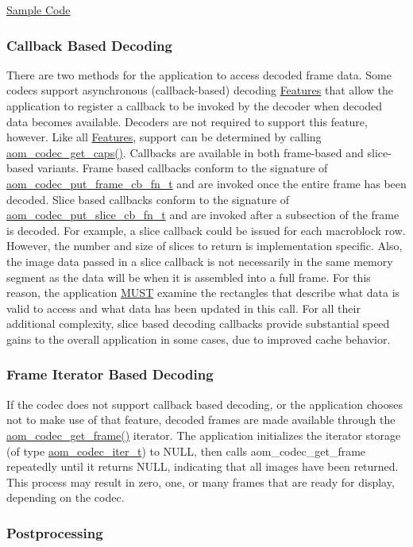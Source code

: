\hyperlink{samples}{Sample Code}\hypertarget{usage_decode_usage_cb}{}\subsubsection{Callback Based Decoding}\label{usage_decode_usage_cb}
There are two methods for the application to access decoded frame data. Some codecs support asynchronous (callback-\/based) decoding \hyperlink{usage_usage_features}{Features} that allow the application to register a callback to be invoked by the decoder when decoded data becomes available. Decoders are not required to support this feature, however. Like all \hyperlink{usage_usage_features}{Features}, support can be determined by calling \hyperlink{group__codec_ga66b1d3c795c3868efc88d73d01439461}{aom\+\_\+codec\+\_\+get\+\_\+caps()}. Callbacks are available in both frame-\/based and slice-\/based variants. Frame based callbacks conform to the signature of \hyperlink{group__cap__put__frame_gade62af02658acd724fda731b6300eec7}{aom\+\_\+codec\+\_\+put\+\_\+frame\+\_\+cb\+\_\+fn\+\_\+t} and are invoked once the entire frame has been decoded. Slice based callbacks conform to the signature of \hyperlink{group__cap__put__slice_ga1eedb3b2df824386126cff04c0ce5bc9}{aom\+\_\+codec\+\_\+put\+\_\+slice\+\_\+cb\+\_\+fn\+\_\+t} and are invoked after a subsection of the frame is decoded. For example, a slice callback could be issued for each macroblock row. However, the number and size of slices to return is implementation specific. Also, the image data passed in a slice callback is not necessarily in the same memory segment as the data will be when it is assembled into a full frame. For this reason, the application \hyperlink{rfc2119_MUST}{M\+U\+ST} examine the rectangles that describe what data is valid to access and what data has been updated in this call. For all their additional complexity, slice based decoding callbacks provide substantial speed gains to the overall application in some cases, due to improved cache behavior.\hypertarget{usage_decode_usage_frame_iter}{}\subsubsection{Frame Iterator Based Decoding}\label{usage_decode_usage_frame_iter}
If the codec does not support callback based decoding, or the application chooses not to make use of that feature, decoded frames are made available through the \hyperlink{group__decoder_ga780aad27a2728abefab725faa3bc4f79}{aom\+\_\+codec\+\_\+get\+\_\+frame()} iterator. The application initializes the iterator storage (of type \hyperlink{group__codec_gadf9e173c9e02788a9999399edab20a02}{aom\+\_\+codec\+\_\+iter\+\_\+t}) to N\+U\+LL, then calls aom\+\_\+codec\+\_\+get\+\_\+frame repeatedly until it returns N\+U\+LL, indicating that all images have been returned. This process may result in zero, one, or many frames that are ready for display, depending on the codec.\hypertarget{usage_decode_usage_postproc}{}\subsubsection{Postprocessing}\label{usage_decode_usage_postproc}
